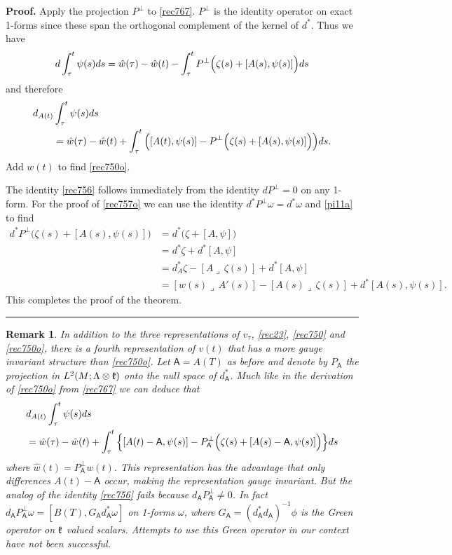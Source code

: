 \documentclass[12pt]{article}
\newtheorem{remark}[theorem]{Remark}
\newenvironment{proof}[1][Proof]{\textbf{#1.} }{\ \rule{0.5em}{0.5em}}
\def \L{\Lambda}
\def \({\Big(}
\def \){\Big)}
\def \As{\mathsf{A}}
\def \w{\omega}
\def \kf{\frak k}
\def \eref{\eqref}
\def \lrc{\lrcorner\,}
\numberwithin{equation}{section}
\begin{document}
    \begin{proof} 
Apply the projection $P^\perp$ to \eref{rec767}.   $P^\perp$ is the identity
operator on exact 1-forms since these span the orthogonal complement of the kernel of $d^*$.
Thus we have
\begin{align}
d\int_\tau^t  \psi(s) ds = \hat w(\tau) - \hat w(t) -\int_\tau^t P^\perp \(\zeta(s) +[A(s), \psi(s)]\) ds \notag
\end{align}
and therefore
\begin{align}
d_{A(t)}&\int_\tau^t  \psi(s) ds  \notag \\
&= \hat w(\tau) - \hat w(t) + \int_\tau^t\([A(t), \psi(s)] - P^\perp \(\zeta(s) +[A(s), \psi(s)]\)\) ds. \notag
\end{align}
Add $w(t)$ to find \eref{rec750o}.

The identity \eref{rec756} follows immediately from  the identity $dP^\perp =0$ on any 1-form.
For the proof of  \eref{rec757o} 
 we can use the identity  $d^*P^\perp \w = d^*\w$  and \eref{pi11a} to find 
\begin{align*}
d^*P^\perp \( \zeta(s) + [A(s), \psi(s)]\)  &= d^*  \Big(\zeta + [A, \psi]\Big)\\
&= d^*   \zeta  +d^* [A, \psi] \\
&= d_A^*\zeta - [A \lrc  \zeta(s) ]   +d^* [A, \psi]  \\
& =[w(s)\lrc A'(s)]  - [A(s) \lrc  \zeta(s) ]   +d^* [A(s), \psi(s)].
\end{align*} 
This completes the proof of the theorem.
\end{proof}

      \begin{remark}  {\rm  
   In addition to the three representations of $v_\tau$, \eref{rec23}, \eref{rec750} and \eref{rec750o},
       there is a fourth representation of $v(t)$ that has a more
 gauge invariant structure than \eref{rec750o}.
Let $\As = A(T)$ as before and denote by $P_\As$ the projection in 
$L^2(M; \L\otimes \kf)$ onto the null space of $d_\As^*$. Much like in the derivation of \eref{rec750o}
 from \eref{rec767} we can deduce  that 
 \begin{align}
&d_{A(t)} \int_\tau^t  \psi(s) ds             \label{rec750A} \\
&= \hat w(\tau) - \hat w(t) +
\int_\tau^t \Big\{ [A(t) - \As, \psi(s)] -P_\As^\perp \(\zeta(s) +[A(s) - \As, \psi(s)]\)\Big\} ds   \notag
\end{align}
where $\hat w(t) = P_\As^\perp w(t)$. 
         This representation has the advantage that only differences $A(t) - \As$ occur, making the
 representation gauge invariant. But the analog of the identity \eref{rec756} fails because 
 $d_\As P_\As^\perp \ne 0$.      In fact $d_\As P_\As^\perp \w = [B(T), G_\As d_\As^*\w]$ on 1-forms
 $\w$, where $G_\As =(d_\As^* d_\As)^{-1} \phi$  is the Green operator on $\kf $ valued scalars.
 Attempts to use this Green operator in our context have not been successful.
}
\end{remark}
\end{document}
